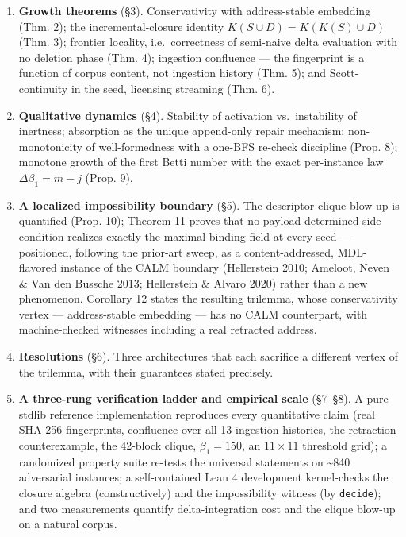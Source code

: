 \documentclass[
  10pt,
]{article}
\providecommand{\tightlist}{%
  \setlength{\itemsep}{0pt}\setlength{\parskip}{0pt}}
\begin{document}
\begin{enumerate}
\def\labelenumi{\arabic{enumi}.}
\tightlist
\item
  \textbf{Growth theorems} (§3). Conservativity with address-stable
  embedding (Thm. 2); the incremental-closure identity
  \(K(S\cup D)=K(K(S)\cup D)\) (Thm. 3); frontier locality,
  i.e.~correctness of semi-naive delta evaluation with no deletion phase
  (Thm. 4); ingestion confluence --- the fingerprint is a function of
  corpus content, not ingestion history (Thm. 5); and Scott-continuity
  in the seed, licensing streaming (Thm. 6).
\item
  \textbf{Qualitative dynamics} (§4). Stability of activation
  vs.~instability of inertness; absorption as the unique append-only
  repair mechanism; non-monotonicity of well-formedness with a one-BFS
  re-check discipline (Prop. 8); monotone growth of the first Betti
  number with the exact per-instance law \(\Delta\beta_1 = m - j\)
  (Prop. 9).
\item
  \textbf{A localized impossibility boundary} (§5). The
  descriptor-clique blow-up is quantified (Prop. 10); Theorem 11 proves
  that no payload-determined side condition realizes exactly the
  maximal-binding field at every seed --- positioned, following the
  prior-art sweep, as a content-addressed, MDL-flavored instance of the
  CALM boundary (Hellerstein 2010; Ameloot, Neven \& Van den Bussche
  2013; Hellerstein \& Alvaro 2020) rather than a new phenomenon.
  Corollary 12 states the resulting trilemma, whose conservativity
  vertex --- address-stable embedding --- has no CALM counterpart, with
  machine-checked witnesses including a real retracted address.
\item
  \textbf{Resolutions} (§6). Three architectures that each sacrifice a
  different vertex of the trilemma, with their guarantees stated
  precisely.
\item
  \textbf{A three-rung verification ladder and empirical scale}
  (§7--§8). A pure-stdlib reference implementation reproduces every
  quantitative claim (real SHA-256 fingerprints, confluence over all 13
  ingestion histories, the retraction counterexample, the 42-block
  clique, \(\beta_1 = 150\), an \(11\times11\) threshold grid); a
  randomized property suite re-tests the universal statements on
  \textasciitilde840 adversarial instances; a self-contained Lean 4
  development kernel-checks the closure algebra (constructively) and the
  impossibility witness (by \texttt{decide}); and two measurements
  quantify delta-integration cost and the clique blow-up on a natural
  corpus.
\end{enumerate}
\end{document}
